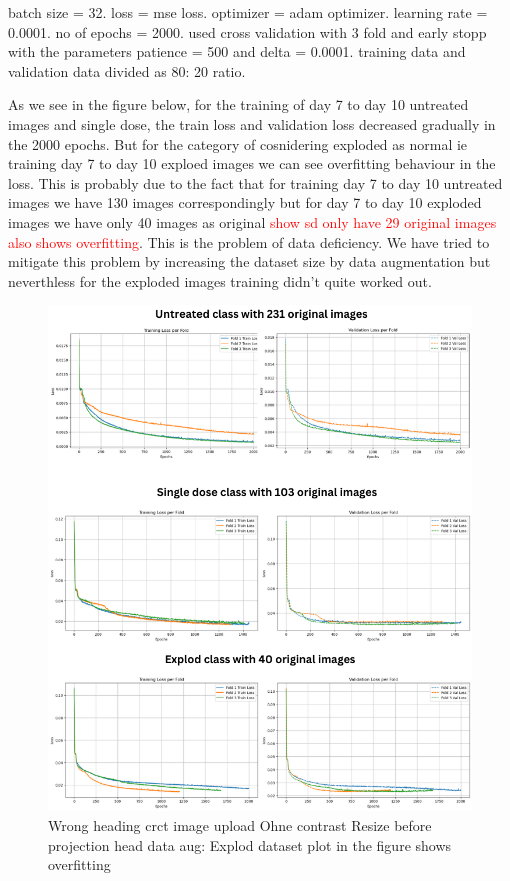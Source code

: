 batch size = 32. loss = mse loss. optimizer = adam optimizer. learning rate = 0.0001. no of epochs = 2000. used cross validation with 3 fold and  early stopp with 
the parameters patience = 500 and delta = 0.0001. training data and validation data divided as 80: 20 ratio.

As we see in the figure below, for the training of day 7 to day 10 untreated images and single dose, the train loss and validation loss decreased gradually  in the 2000 epochs. But for the category of cosnidering exploded as normal ie training  day 7 to day 10 exploed images we can see overfitting behaviour in the loss. This is probably due to the fact that for training day 7 to day 10 untreated images we have 130 images correspondingly but for day 7 to day 10 exploded images we have only 40 images as original \textcolor{red}{show sd only have 29 original images also shows overfitting}. This is the problem of data deficiency. We have tried to mitigate this problem by increasing the dataset size by data augmentation but neverthless for the exploded images training didn't quite worked out.


\begin{figure}[H]
  \centering
  \includegraphics[scale=0.5]{figures/overfit.png} 
  \caption{Wrong heading crct image upload Ohne contrast Resize  before projection head data aug: Explod dataset plot in the figure shows overfitting }
  \label{fig:unloss}
\end{figure}


